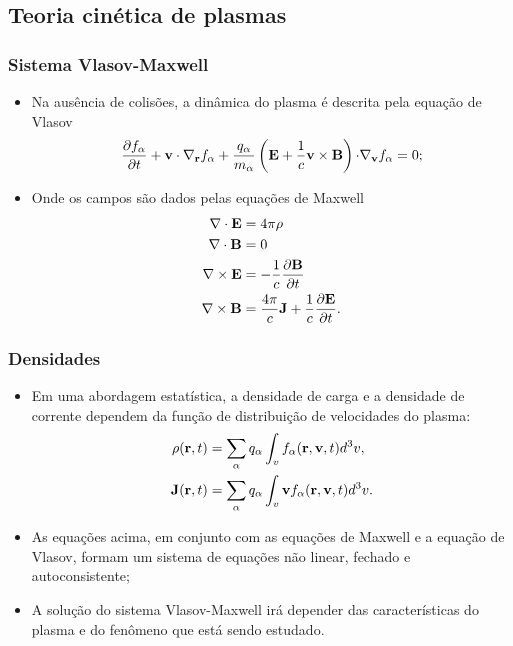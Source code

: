 \documentclass[10pt,aspectratio=1610,lualatex]{beamer}
\begin{document}
\subsection{Teoria cinética de plasmas}
\begin{frame}
  \frametitle{Sistema Vlasov-Maxwell}
  \begin{itemize}
    \item Na  ausência de  colisões, a dinâmica  do plasma  é descrita
    pela equação de Vlasov
    \begin{equation*}
      \frac{\partial f_\alpha}{\partial t}
      +{\bf v \cdot \nabla_r}f_\alpha
      +\frac{q_\alpha}{m_\alpha}
      \left({\bf E}+\frac{1}{c}{\bf v}\times {\bf B} \right)
      {\bf \cdot \nabla_v}f_\alpha=0;
    \end{equation*}
    \pause
    \vspace{0.3cm}
    \item Onde os campos são dados pelas equações de Maxwell
    \begin{equation*}
      \begin{split}
	{\bf \nabla \cdot E}&= 4\pi\rho\\
	{\bf \nabla \cdot B}&= 0\\
	{\bf \nabla \times E}&= -\frac{1}{c}
	\frac{\partial{\bf B}}{\partial t}\\
	{\bf \nabla \times B}&=\frac{4\pi}{c}{\bf J}
	+\frac{1}{c}\frac{\partial{\bf E}}{\partial t}.
      \end{split}
    \end{equation*} 
  \end{itemize}
\end{frame}

\begin{frame}
  \frametitle{Densidades}
  \begin{itemize}
    \item Em uma abordagem estatística, a densidade de carga e a
    densidade de corrente dependem da função de distribuição de
    velocidades do plasma:
    \begin{displaymath}
      \begin{split}
        \rho({\bf r},t)&
        =\sum_\alpha q_{\alpha}\int_v f_\alpha({\bf r},{\bf v},t)d^3v,\\
        {\bf J}({\bf r},t)&= \sum_\alpha q_\alpha\int_v{\bf v}
         f_\alpha({\bf r},{\bf v},t) d^3v.
      \end{split}
    \end{displaymath}
    \pause
    \item As equações acima, em conjunto com as equações de Maxwell e
    a equação de Vlasov, formam um sistema de equações não linear,
    fechado e autoconsistente;
    \pause
    \vspace{0.2cm}
    \item A solução do sistema Vlasov-Maxwell irá depender das características
    do plasma e do fenômeno que está sendo estudado.
  \end{itemize}
\end{frame}
\end{document}
